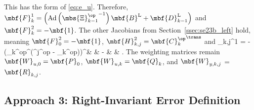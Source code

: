This has the form of \eqref{eq:e_u}. Therefore, $\mbf{F}_k^1 = \left(\textrm{Ad}\left({\mbs{\Xi}_{k-1}^\op}^{-1}\right)\mbf{B}^\textrm{L} + \mbf{D}_{k-1}^\textrm{L}\right)$ and $\mbf{F}_k^2 = -\mbf{1}$. The other Jacobians from Section~\ref{ssec:se23b_left} hold, meaning $\mbf{F}_0^2 = -\mbf{1}$, $\mbf{H}_{k,j}^2 = {\mbf{C}_k^\op}^\trans$ and 
\bdis
	_{k,j}^1 = 
	-
		 \left({_k^\textrm{op}}^\trans\left({^j}^\textrm{op} - _k^\textrm{op}\right)\right)^\times &  & - & \mbf{0} & 
	\ema.
\edis 
The weighting matrices remain $\mbf{W}_{u,0} = \mbf{P}_0$, $\mbf{W}_{u,k} = \mbf{Q}_k$, and $\mbf{W}_{y,k,j}$ = $\mbf{R}_{k,j}$.



\subsection{\NoAutoSpacing Approach 3: Right-Invariant Error Definition}
\label{ssec:se23b_right}

